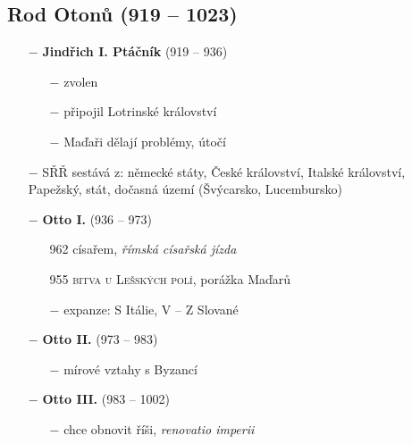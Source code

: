 \documentclass{article}
\begin{document}
\begin{minipage}{0.6\textwidth}
    \subsection*{Rod Otonů (919 -- 1023)}
    \begin{itemize}
        \vspace{-0.5em}
        \setlength\itemsep{0.15em}
        \item[$-$] \textbf{Jindřich I. Ptáčník} (919 -- 936)
            \begin{itemize}
                \vspace{-0.5em}
                \setlength\itemsep{0.15em}
                \item[$-$] zvolen
                \item[$-$] připojil Lotrinské království
                \item[$-$] Maďaři dělají problémy, útočí
            \end{itemize}
        \item[$-$] SŘŘ sestává z: německé státy, České království, Italské království, Papežský, stát, dočasná území (Švýcarsko, Lucembursko)
        \item[$-$] \textbf{Otto I.} (936 -- 973)
            \begin{itemize}
                \vspace{-0.5em}
                \setlength\itemsep{0.15em}
                \item[962] císařem, \textit{římská císařská jízda}
                \item[955] \textsc{bitva u Lešských polí}, porážka Maďarů
                \item[$-$] expanze: S Itálie, V -- Z Slované
            \end{itemize}
        \item[$-$] \textbf{Otto II.} (973 -- 983)
            \begin{itemize}
                \vspace{-0.5em}
                \setlength\itemsep{0.15em}
                \item[$-$] mírové vztahy s Byzancí
            \end{itemize}
        \item[$-$] \textbf{Otto III.} (983 -- 1002)
            \begin{itemize}
                \vspace{-0.5em}
                \setlength\itemsep{0.15em}
                \item[$-$] chce obnovit říši, \textit{renovatio imperii}

\end{itemize}
\end{itemize}
\end{minipage}
\end{document}
